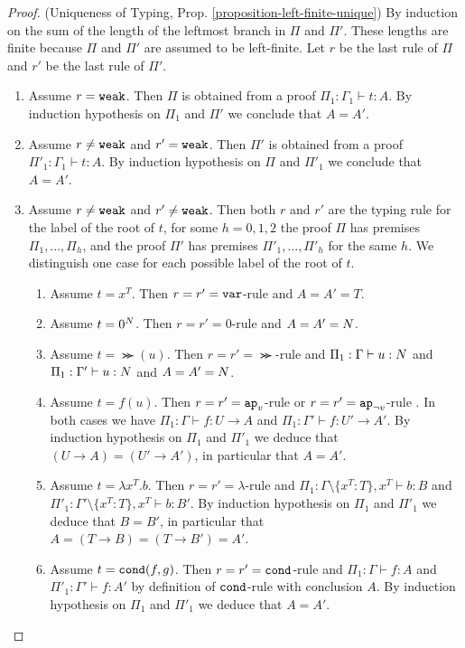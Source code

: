 \begin{proof}(Uniqueness of Typing, 
Prop. \ref{proposition-left-finite-unique})
By induction on the sum of the length of the leftmost branch in $\Pi$ and $\Pi'$. These lengths 
are finite because $\Pi$ and $\Pi'$ are assumed to be left-finite. Let $r$ be the last rule of $\Pi$ 
and $r'$ be the last rule of $\Pi'$.
\begin{enumerate}
\item
Assume $r = {\tt weak}$. Then $\Pi$ is obtained from a proof $\Pi_1:\Gamma_1 \vdash t:A$. 
By induction hypothesis on $\Pi_1$ and $\Pi'$ we conclude that $A = A'$.

\item
Assume $r \not = {\tt weak}$ and $r' = {\tt weak}$. 
Then $\Pi'$ is obtained from a proof $\Pi'_1:\Gamma_1 \vdash t:A$. 
By induction hypothesis on $\Pi$ and $\Pi'_1$ we conclude that $A = A'$.

\item
Assume  $r \not = {\tt weak}$ and $r' \not = {\tt weak}$. Then both $r$ and $r'$ are the typing rule for the label of the root of $t$, for some
$h=0,1,2$ the proof $\Pi$ has premises $\Pi_1, \ldots, \Pi_h$,
and the proof $\Pi'$ has premises $\Pi'_1, \ldots, \Pi'_h$ for the same $h$. 
We distinguish one case for each possible label of the root of $t$.

\begin{enumerate}
\item
Assume $t = x^T$. Then $r=r'={\tt var}$-rule and $A = A' = T$.

\item
Assume $t =0^{N}$. Then $r=r'=0$-rule and $A = A' = {N}$.

\item
Assume $t =\Succ(u)$. Then $r=r'=\Succ$-rule  and $\Pi_1:\Gamma \vdash u: {N}$
and $\Pi_1:\Gamma' \vdash u:{N}$ and $A = A' = {N}$.

\item
Assume $t = f(u)$. Then $r=r'=\apvar$-rule or $r=r'=\apnotvar$-rule .
In both cases we have $\Pi_1:\Gamma \vdash f:U \rightarrow A$
and $\Pi_1:\Gamma' \vdash f:U' \rightarrow A'$. By induction hypothesis on 
$\Pi_1$ and $\Pi'_1$ we deduce that $(U \rightarrow A) = (U' \rightarrow A')$, 
in particular that $A = A'$.

\item
Assume $t = \lambda x^T.b$. Then $r=r'=\lambda$-rule and 
$\Pi_1:\Gamma\setminus\{x^T:T\}, x^T \vdash b:B$ and 
$\Pi'_1:\Gamma'\setminus\{x^T:T\}, x^T \vdash b:B'$. 
By induction hypothesis on $\Pi_1$ and $\Pi'_1$ we deduce that $B=B'$, in particular that $A = (T \rightarrow B) = (T \rightarrow B') = A'$.

\item
Assume $t = {\tt cond}(f,g)$. Then $r=r'={\tt cond}$-rule and $\Pi_1:\Gamma \vdash f:A$
and $\Pi'_1:\Gamma' \vdash f:A'$ by definition of ${\tt cond}$-rule with conclusion
$A$. By induction hypothesis on $\Pi_1$ and
$\Pi'_1$ we deduce that $A = A'$.

\end{enumerate}
\end{enumerate}
\end{proof}

